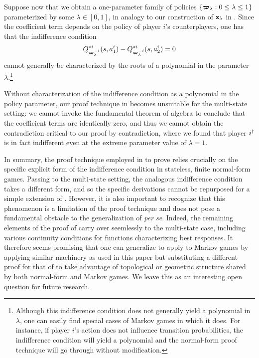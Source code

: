 Suppose now that we obtain a one-parameter family of policies $\{ \bm{\varpi}_{\lambda} : 0 \leq \lambda \leq 1 \}$ parameterized by some $\lambda \in [0,1]$, in analogy to our construction of ${\mathbf{z}}_{\lambda}$ in . Since the coefficient term depends on the policy of player $i$'s counterplayers, one has that the indifference condition 
\[ 
Q^{*i}_{\bm{\varpi}^{-i}_{\lambda}} ( s, a^i_1 ) - Q^{*i}_{\bm{\varpi}^{-i}_{\lambda}} ( s, a^i_2 ) = 0
\]
cannot generally be characterized by the roots of a polynomial in the parameter $\lambda$.\footnote{Although this indifference condition does not generally yield a polynomial in $\lambda$, one can easily find special cases of Markov games in which it does. For instance, if player $i$'s action does not influence transition probabilities, the indifference condition will yield a polynomial and the normal-form proof technique will go through without modification.}

Without characterization of the indifference condition as a polynomial in the policy parameter, our proof technique in  becomes unsuitable for the multi-state setting: we cannot invoke the fundamental theorem of algebra to conclude that the coefficient terms are identically zero, and thus we cannot obtain the contradiction critical to our proof by contradiction, where we found that player $i^{\dagger}$ is in fact indifferent even at the extreme parameter value of $\lambda = 1$. 

In summary, the proof technique employed in  to prove  relies crucially on the specific explicit form of the indifference condition in stateless, finite normal-form games. Passing to the multi-state setting, the analogous indifference condition takes a different form, and so the specific derivations cannot be repurposed for a simple extension of . However, it is also important to recognize that this phenomenon is a limitation of the proof technique and does not pose a fundamental obstacle to the generalization of  \emph{per se}. Indeed, the remaining elements of the proof of  carry over seemlessly to the multi-state case, including various continuity conditions for functions characterizing best responses. It therefore seems promising that one can generalize  to apply to Markov games by applying similar machinery as used in this paper but substituting a different proof for that of  to take advantage of topological or geometric structure shared by both normal-form and Markov games. We leave this as an interesting open question for future research. 